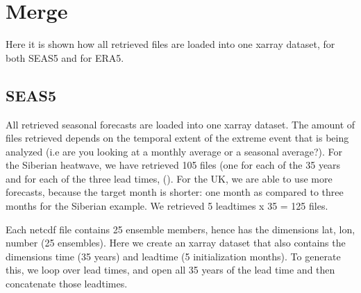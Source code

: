\documentclass[letterpaper,10pt,english]{sphinxmanual}
\begin{document}
\section{Merge}
\label{\detokenize{Notebooks/2.Preprocess/2.Preprocess:Merge}}
Here it is shown how all retrieved files are loaded into one xarray dataset, for both SEAS5 and for ERA5.


\subsection{SEAS5}
\label{\detokenize{Notebooks/2.Preprocess/2.Preprocess:SEAS5}}
All retrieved seasonal forecasts are loaded into one xarray dataset. The amount of files retrieved depends on the temporal extent of the extreme event that is being analyzed (i.e are you looking at a monthly average or a seasonal average?). For the Siberian heatwave, we have retrieved 105 files (one for each of the 35 years and for each of the three lead times, ({\hyperref[\detokenize{Notebooks/1.Download/1.Retrieve::doc}]{}}). For the UK, we are able to use more forecasts, because the target month is shorter:
one month as compared to three months for the Siberian example. We retrieved 5 leadtimes x 35 = 125 files.

Each netcdf file contains 25 ensemble members, hence has the dimensions lat, lon, number (25 ensembles). Here we create an xarray dataset that also contains the dimensions time (35 years) and leadtime (5 initialization months). To generate this, we loop over lead times, and open all 35 years of the lead time and then concatenate those leadtimes.

{
\begin{sphinxVerbatim}[commandchars=\\\{\}]
\llap{\color{nbsphinxin}[1]:\,\hspace{\fboxrule}\hspace{\fboxsep}}
   
  
\end{sphinxVerbatim}
}
\end{document}
